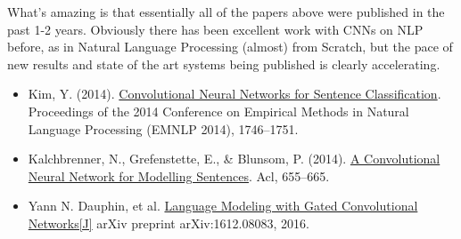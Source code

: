 What's amazing is that essentially all of the papers above were published in the past 1-2 years. Obviously there has been excellent work with CNNs on NLP before, as in Natural Language Processing (almost) from Scratch, but the pace of new results and state of the art systems being published is clearly accelerating.

\begin{itemize}
\item Kim, Y. (2014). \href{http://arxiv.org/pdf/1408.5882}{Convolutional Neural Networks for Sentence Classification}. Proceedings of the 2014 Conference on Empirical Methods in Natural Language Processing (EMNLP 2014), 1746–1751.
\item Kalchbrenner, N., Grefenstette, E., \& Blunsom, P. (2014). \href{http://arxiv.org/pdf/1404.2188.pdf}{A Convolutional Neural Network for Modelling Sentences}. Acl, 655–665.
\item Yann N. Dauphin, et al. \href{https://arxiv.org/pdf/1612.08083v1.pdf}{Language Modeling with Gated Convolutional Networks[J]} arXiv preprint arXiv:1612.08083, 2016.
\end{itemize}

